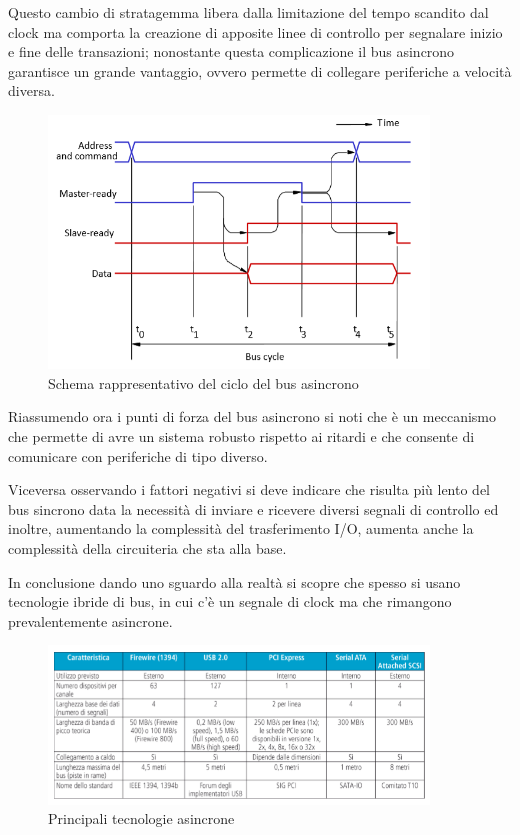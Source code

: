 \documentclass[class=book, crop=false, oneside]{standalone}
\begin{document}
Questo cambio di stratagemma libera dalla limitazione del tempo scandito dal clock ma comporta la creazione di apposite linee di controllo per segnalare inizio e fine delle transazioni;
nonostante questa complicazione il bus asincrono garantisce un grande vantaggio, ovvero permette di collegare periferiche a velocità diversa.

\begin{figure}[H]
	\centering
	\includegraphics[width=0.9\textwidth,keepaspectratio]{bus-asincrono}
	\caption{Schema rappresentativo del ciclo del bus asincrono}
\end{figure}

Riassumendo ora i punti di forza del bus asincrono si noti che è un meccanismo che permette di avre un sistema robusto rispetto ai ritardi e che consente di comunicare con periferiche di tipo diverso.

Viceversa osservando i fattori negativi si deve indicare che risulta più lento del bus sincrono data la necessità di inviare e ricevere diversi segnali di controllo ed inoltre, aumentando la complessità del trasferimento I/O, aumenta anche la complessità della circuiteria che sta alla base.

In conclusione dando uno sguardo alla realtà si scopre che spesso si usano tecnologie ibride di bus, in cui c’è un segnale di clock ma che rimangono prevalentemente asincrone.

\begin{figure}[H]
	\centering
	\includegraphics[width=0.9\textwidth,keepaspectratio]{tecnologie-asincrone}
	\caption{Principali tecnologie asincrone}
\end{figure}
\end{document}
